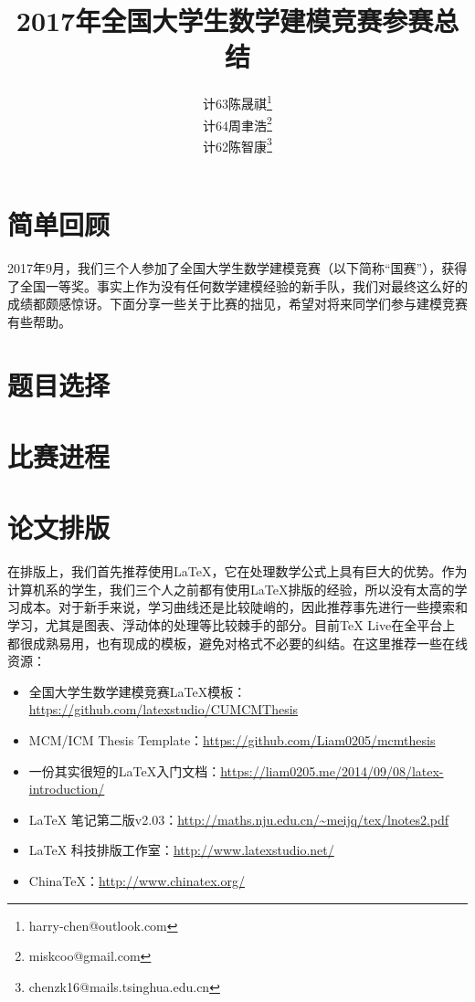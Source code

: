 \documentclass[fontset=adobe]{ctexart}
\newcommand{\arttitle}{2017年全国大学生数学建模竞赛参赛总结}
\begin{document}
\title{\bfseries{\arttitle}}
\author{
	计63\hspace{1em}陈晟祺\thanks{harry-chen@outlook.com}\\
    计64\hspace{1em}周聿浩\thanks{miskcoo@gmail.com}\\
    计62\hspace{1em}陈智康\thanks{chenzk16@mails.tsinghua.edu.cn}
}
\date{}
\maketitle

\section{简单回顾}
2017年9月，我们三个人参加了全国大学生数学建模竞赛（以下简称“国赛”），获得了全国一等奖。事实上作为没有任何数学建模经验的新手队，我们对最终这么好的成绩都颇感惊讶。下面分享一些关于比赛的拙见，希望对将来同学们参与建模竞赛有些帮助。

\section{题目选择}

\section{比赛进程}

\section{论文排版}
在排版上，我们首先推荐使用\LaTeX{}，它在处理数学公式上具有巨大的优势。作为计算机系的学生，我们三个人之前都有使用\LaTeX{}排版的经验，所以没有太高的学习成本。对于新手来说，学习曲线还是比较陡峭的，因此推荐事先进行一些摸索和学习，尤其是图表、浮动体的处理等比较棘手的部分。目前\TeX{} Live在全平台上都很成熟易用，也有现成的模板，避免对格式不必要的纠结。在这里推荐一些在线资源：

\begin{itemize}
  \item 全国大学生数学建模竞赛\LaTeX{}模板：\url{https://github.com/latexstudio/CUMCMThesis}
  \item MCM/ICM Thesis Template：\url{https://github.com/Liam0205/mcmthesis}
  \item 一份其实很短的\LaTeX{}入门文档：\url{https://liam0205.me/2014/09/08/latex-introduction/}
  \item \LaTeX{} 笔记第二版v2.03：\url{http://maths.nju.edu.cn/~meijq/tex/lnotes2.pdf}
  \item \LaTeX{} 科技排版工作室：\url{http://www.latexstudio.net/}
  \item China\TeX{}：\url{http://www.chinatex.org/}
\end{itemize}
\end{document}
